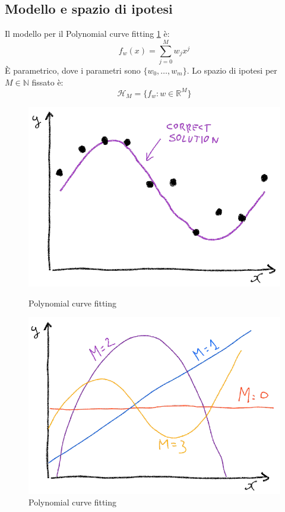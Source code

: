 \subsection{Modello e spazio di ipotesi}
Il modello per il Polynomial curve fitting \ref{fig:chapter02-10} \`e:
$$f_w(x) = \sum\limits_{j = 0}^M w_jx^j$$
\`E parametrico, dove i parametri sono $\{w_0,\dots, w_m\}$.
Lo spazio di ipotesi per $M\in\mathbb{N}$ fissato \`e:
$$\mathcal{H}_M = \{f_w:w\in\mathbb{R}^M\}$$


\begin{figure}
	\centering
	\begin{minipage}{.5\textwidth}
		\centering
		\includegraphics[width=1\linewidth]{imgs/chapter2/img9}
		\caption{Polynomial curve fitting}
		\label{fig:chapter02-09}
	\end{minipage}%
	\begin{minipage}{.5\textwidth}
		\centering
		\includegraphics[width=1\linewidth]{imgs/chapter2/img10}
		\caption{Polynomial curve fitting}
		\label{fig:chapter02-10}
	\end{minipage}
\end{figure}



